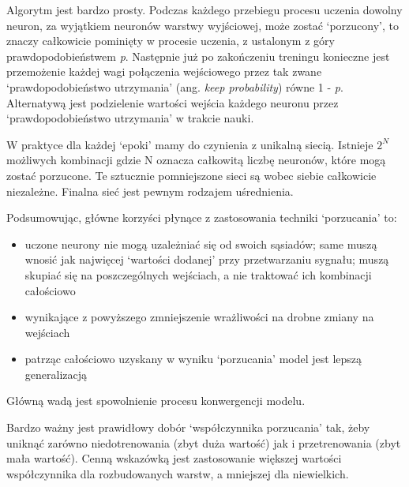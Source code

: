 \documentclass[a4paper,11pt]{article}
\begin{document}
    \bigskip

    Algorytm jest bardzo prosty. Podczas każdego przebiegu procesu uczenia dowolny neuron, za wyjątkiem neuronów warstwy wyjściowej, może zostać `porzucony', to znaczy całkowicie pominięty w procesie uczenia, z ustalonym z góry prawdopodobieństwem \textit{p}. Następnie już po zakończeniu treningu konieczne jest przemożenie każdej wagi połączenia wejściowego przez tak zwane `prawdopodobieństwo utrzymania' (ang. \textit{keep probability}) równe 1 - \textit{p}. Alternatywą jest podzielenie wartości wejścia każdego neuronu przez `prawdopodobieństwo utrzymania' w trakcie nauki\cite{UczenieMaszynowe2018}.

    \bigskip

    W praktyce dla każdej `epoki' mamy do czynienia z unikalną siecią. Istnieje $2^{N}$ możliwych kombinacji gdzie N oznacza całkowitą liczbę neuronów, które mogą zostać porzucone. Te sztucznie pomniejszone sieci są wobec siebie całkowicie niezależne. Finalna sieć jest pewnym rodzajem uśrednienia\cite{UczenieMaszynowe2018}.

    \bigskip

    Podsumowując, główne korzyści płynące z zastosowania techniki `porzucania' to\cite{UczenieMaszynowe2018}:
    \begin{itemize}
        \item uczone neurony nie mogą uzależniać się od swoich sąsiadów; same muszą wnosić jak najwięcej `wartości dodanej' przy przetwarzaniu sygnału; muszą skupiać się na poszczególnych wejściach, a nie traktować ich kombinacji całościowo
        \item wynikające z powyższego zmniejszenie wrażliwości na drobne zmiany na wejściach
        \item patrząc całościowo uzyskany w wyniku `porzucania' model jest lepszą generalizacją
    \end{itemize}
    \smallskip
    Główną wadą jest spowolnienie procesu konwergencji modelu\cite{UczenieMaszynowe2018}.

    \bigskip

    Bardzo ważny jest prawidłowy dobór `współczynnika porzucania' tak, żeby uniknąć zarówno niedotrenowania (zbyt duża wartość) jak i przetrenowania (zbyt mała wartość). Cenną wskazówką jest zastosowanie większej wartości współczynnika dla rozbudowanych warstw, a mniejszej dla niewielkich.

    \bigskip
\end{document}
